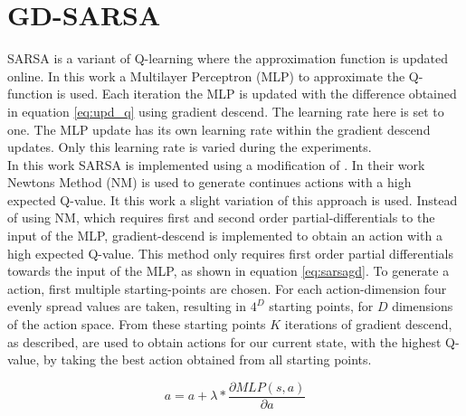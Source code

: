 
\section{GD-SARSA}
SARSA is a variant of Q-learning where the approximation function is updated online. In this work a Multilayer Perceptron (MLP) to approximate the Q-function is used. Each iteration the MLP is updated with the difference obtained in equation \eqref{eq:upd_q} using gradient descend. The learning rate here is set to one. The MLP update has its own learning rate within the gradient descend updates. Only this learning rate is varied during the experiments. \\
\newline
In this work SARSA is implemented using a modification of \cite{nichols2015continuous}. In their work Newtons Method (NM) is used to generate continues actions with a high expected Q-value.
It this work a slight variation of this approach is used. Instead of using NM, which requires first and second order partial-differentials to the input of the MLP, gradient-descend is implemented to obtain an action with a high expected Q-value. This method only requires first order partial differentials towards the input of the MLP, as shown in equation \eqref{eq:sarsagd}.
To generate a action, first multiple starting-points are chosen. For each action-dimension four evenly spread values are taken, resulting in $4 ^ D$ starting points, for $D$ dimensions of the action space. From these starting points $K$ iterations of gradient descend, as described, are used to obtain actions for our current state, with the highest Q-value, by taking the best action obtained from all starting points.


\begin{equation}
\label{eq:sarsagd}
a = a + \lambda * \frac{\partial MLP(s,a)}{\partial a}
\end{equation}
